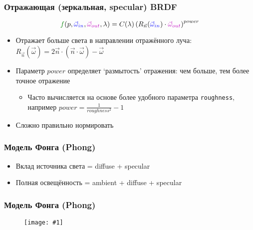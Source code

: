 \documentclass{beamer}
\newcommand{\slideimage}[1]{
  \begin{figure}
    \begin{adjustbox}{width=\textwidth, totalheight=\textheight-2\baselineskip-2\baselineskip,keepaspectratio}
      \texttt{[image: \#1]}
    \end{adjustbox}
  \end{figure}
}
\begin{document}
\begin{frame}[fragile]
\frametitle{Отражающая (зеркальная, specular) BRDF}
\begin{equation*}
{\color{green}f}(p, {\color{blue}\vec\omega_{in}}, {\color{magenta}\vec\omega_{out}}, \lambda) = C(\lambda) \left(R_{\vec n}({\color{blue}\vec\omega_{in}})\cdot{\color{magenta}\vec\omega_{out}}\right)^{power}
\end{equation*}
\begin{itemize}
\item Отражает больше света в направлении отражённого луча: \begin{math}R_{\vec n}(\vec \omega) = 2\vec n \cdot (\vec n \cdot \vec \omega) - \vec \omega\end{math}
\item Параметр \begin{math}power\end{math} определяет `размытость' отражения: чем больше, тем более точное отражение
\begin{itemize}
\item Часто вычисляется на основе более удобного параметра \verb|roughness|, например \begin{math}power = \frac{1}{roughness^2}-1\end{math}
\end{itemize}
\item Сложно правильно нормировать
\end{itemize}
\end{frame}

\begin{frame}[fragile]
\frametitle{Модель Фонга (Phong)}
\begin{itemize}
\item Вклад источника света = diffuse + specular
\item Полная освещённость = ambient + diffuse + specular
\end{itemize}
\end{frame}

\begin{frame}[fragile]
\frametitle{Модель Фонга (Phong)}
\slideimage{phong.png}
\end{frame}
\end{document}
